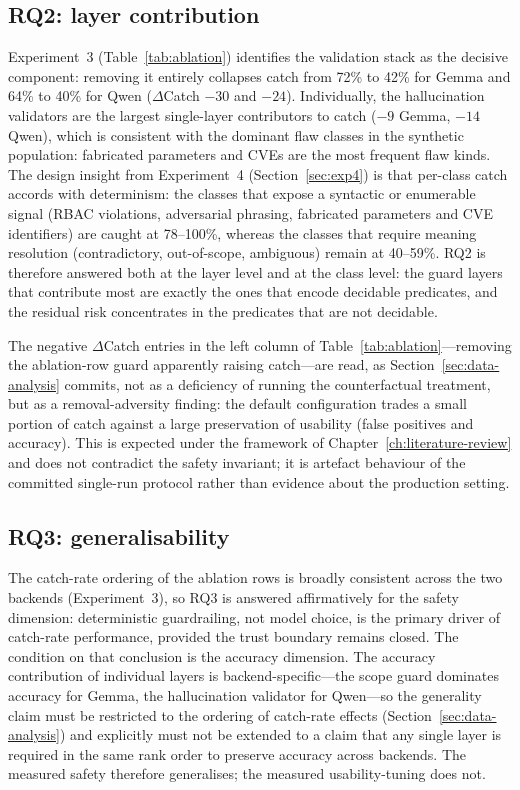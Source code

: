 \subsection*{RQ2: layer contribution}

Experiment~3 (Table~\ref{tab:ablation}) identifies the validation stack as the
decisive component: removing it entirely collapses catch from 72\% to 42\% for
Gemma and 64\% to 40\% for Qwen ($\Delta$Catch $-30$ and $-24$). Individually,
the hallucination validators are the largest single-layer contributors to catch
($-9$ Gemma, $-14$ Qwen), which is consistent with the dominant flaw classes in
the synthetic population: fabricated parameters and CVEs are the most frequent
flaw kinds. The design insight from Experiment~4
(Section~\ref{sec:exp4}) is that per-class catch accords with determinism:
the classes that expose a syntactic or enumerable signal (RBAC violations,
adversarial phrasing, fabricated parameters and CVE identifiers) are caught at
78--100\%, whereas the classes that require meaning resolution
(contradictory, out-of-scope, ambiguous) remain at 40--59\%. RQ2 is therefore
answered both at the layer level and at the class level: the guard layers that
contribute most are exactly the ones that encode decidable predicates, and the
residual risk concentrates in the predicates that are not decidable.

The negative $\Delta$Catch entries in the left column of
Table~\ref{tab:ablation}---removing the ablation-row guard apparently raising
catch---are read, as Section~\ref{sec:data-analysis} commits, not as a
deficiency of running the counterfactual treatment, but as a removal-adversity
finding: the default configuration trades a small portion of catch against a
large preservation of usability (false positives and accuracy). This is
expected under the framework of Chapter~\ref{ch:literature-review} and does not
contradict the safety invariant; it is artefact behaviour of the committed
single-run protocol rather than evidence about the production setting.

\subsection*{RQ3: generalisability}

The catch-rate ordering of the ablation rows is broadly consistent across the
two backends (Experiment~3), so RQ3 is answered affirmatively for the safety
dimension: deterministic guardrailing, not model choice, is the primary driver
of catch-rate performance, provided the trust boundary remains closed. The
condition on that conclusion is the accuracy dimension. The accuracy
contribution of individual layers is backend-specific---the scope guard
dominates accuracy for Gemma, the hallucination validator for Qwen---so the 
generality claim must be restricted to the ordering of catch-rate effects
(Section~\ref{sec:data-analysis}) and explicitly must not be extended to a
claim that any single layer is required in the same rank order to preserve
accuracy across backends. The measured safety therefore generalises; the
measured usability-tuning does not.

